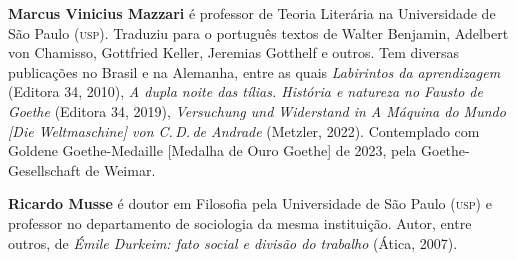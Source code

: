 \textbf{Marcus Vinicius Mazzari} é professor de Teoria Literária na Universidade de São Paulo (\textsc{usp}). Traduziu para o português textos de Walter Benjamin, Adelbert von Chamisso, Gottfried Keller, Jeremias Gotthelf e outros. Tem diversas publicações no Brasil e na Alemanha, entre as quais \textit{Labirintos da aprendizagem} (Editora 34, 2010), \textit{A dupla noite das tílias. História e natureza no Fausto de Goethe} (Editora 34, 2019), \textit{Versuchung und Widerstand in A Máquina do Mundo {[}Die Weltmaschine{]} von C.\,D.\,de Andrade} (Metzler, 2022). Contemplado com Goldene Goethe-Medaille {[}Medalha de Ouro Goethe{]} de 2023, pela Goethe-Gesellschaft de Weimar.

\textbf{Ricardo Musse} é doutor em Filosofia pela Universidade de São Paulo (\textsc{usp}) e professor no departamento de sociologia da mesma instituição. Autor, entre outros, de \textit{Émile Durkeim: fato social e divisão do trabalho} (Ática, 2007).\par





